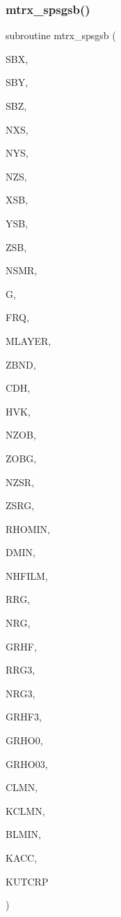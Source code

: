 \subsubsection{\texorpdfstring{mtrx\+\_\+spsgsb()}{mtrx\_spsgsb()}}
{\footnotesize\ttfamily subroutine mtrx\+\_\+spsgsb (\begin{DoxyParamCaption}\item[{real}]{S\+BX,  }\item[{real}]{S\+BY,  }\item[{real}]{S\+BZ,  }\item[{integer}]{N\+XS,  }\item[{integer}]{N\+YS,  }\item[{integer}]{N\+ZS,  }\item[{real}]{X\+SB,  }\item[{real}]{Y\+SB,  }\item[{real}]{Z\+SB,  }\item[{integer}]{N\+S\+MR,  }\item[{complex, dimension(nsmr/3,3)}]{G,  }\item[{real}]{F\+RQ,  }\item[{integer}]{M\+L\+A\+Y\+ER,  }\item[{real, dimension(0\+:mlayer)}]{Z\+B\+ND,  }\item[{complex, dimension(0\+:mlayer)}]{C\+DH,  }\item[{real, dimension(0\+:mlayer)}]{H\+VK,  }\item[{integer}]{N\+Z\+OB,  }\item[{real, dimension(nzob)}]{Z\+O\+BG,  }\item[{integer}]{N\+Z\+SR,  }\item[{real, dimension(2,nzsr)}]{Z\+S\+RG,  }\item[{real}]{R\+H\+O\+M\+IN,  }\item[{real}]{D\+M\+IN,  }\item[{integer}]{N\+H\+F\+I\+LM,  }\item[{real, dimension(nhfilm)}]{R\+RG,  }\item[{integer}]{N\+RG,  }\item[{complex, dimension(11,nhfilm,nzsr,nzob)}]{G\+R\+HF,  }\item[{real, dimension(nrg3)}]{R\+R\+G3,  }\item[{integer}]{N\+R\+G3,  }\item[{complex, dimension(11,nhfilm,nzsr)}]{G\+R\+H\+F3,  }\item[{complex, dimension(4,nzsr,nzob)}]{G\+R\+H\+O0,  }\item[{complex, dimension(4,nzsr)}]{G\+R\+H\+O03,  }\item[{real}]{C\+L\+MN,  }\item[{integer}]{K\+C\+L\+MN,  }\item[{real}]{B\+L\+M\+IN,  }\item[{integer}]{K\+A\+CC,  }\item[{integer}]{K\+U\+T\+C\+RP }\end{DoxyParamCaption})}

